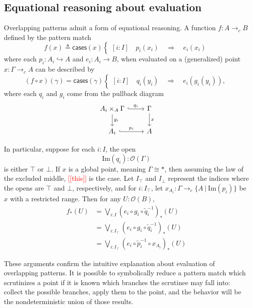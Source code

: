 \documentclass[conference]{IEEEtran}
\newcommand{\hookto}{\hookrightarrow}
\newcommand{\cto}{\to_c}
\newcommand{\suchthat}{\ |\ }
\newcommand{\One}{\ast}
\newcommand{\Open}[1]{\mathcal{O}({#1})}
\newcommand{\Img}[1]{\text{Im}\left({#1}\right)}
\newcommand{\Branch}{\Rightarrow}
\newcommand{\note}[1]{\textcolor{red}{[[{#1}]]}}
\begin{document}
\subsection{Equational reasoning about evaluation}

Overlapping patterns admit a form of equational reasoning. A function $f : A \cto B$ defined by the pattern match
\[
f(x) \triangleq \mathsf{cases}(x)
\begin{cases}
[i : I] \quad p_i(x_i) \quad \Branch \quad e_i(x_i)
\end{cases}
\]
where each $p_i : A_i \hookto A$ and $e_i : A_i \to B$,
when evaluated on a (generalized) point $x : \Gamma \cto A$
can be described by
\[
(f \circ x)(\gamma) = \mathsf{cases}(\gamma)
\begin{cases}
[i : I] \quad q_i(y_i) \quad \Branch \quad e_i(g_i(y_i)),
\end{cases}
\]
where each $q_i$ and $g_i$ come from the pullback diagram
\begin{equation*}
\begin{tikzcd}
A_i \times_A \Gamma \arrow[r, hook, "q_i"]
   \arrow[d, "g_i"]
& \Gamma \arrow[d, "x"]
\\ A_i \arrow[r, hook, "p_i"]
& A
\end{tikzcd}
\end{equation*}

In particular, suppose for each $i : I$, the open
\[
\Img{q_i} : \Open{\Gamma}
\]
is either $\top$ or $\bot$. If $x$ is a global point, meaning $\Gamma \cong \One$, then assuming the law of the excluded middle, \note{this} is the case. Let $I_\top$ and $I_\bot$ represent the indices where the opens are $\top$ and $\bot$, respectively, and for $i : I_\top$, let $x_{A_i} : \Gamma \cto \{ A \suchthat \Img{p_i} \}$ be $x$ with a restricted range. Then for any $U : \Open{B}$,
\begin{align*}
f_*(U) &= \bigvee_{i : I} (e_i \circ g_i \circ \tilde{q}_i^{-1})_*(U)
\\ &= \bigvee_{i : I_\top} (e_i \circ g_i \circ \tilde{q}_i^{-1})_*(U)
\\ &= \bigvee_{i : I_\top} (e_i \circ \tilde{p}_i^{-1} \circ x_{A_i})_*(U)
\end{align*}

These arguments confirm the intuitive explanation about evaluation of overlapping patterns. It is possible to symbolically reduce a pattern match which scrutinizes a point if it is known which branches the scrutinee may fall into: collect the possible branches, apply them to the point, and the behavior will be the nondeterministic union of those results.
\end{document}

